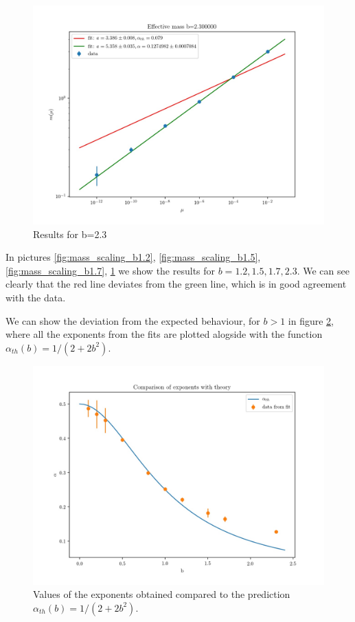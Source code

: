 \documentclass[12pt,a4paper]{report}
\begin{document}
 \begin{figure}
\centering
\includegraphics[width=1.0\textwidth]{b2_3}
\caption{Results for b=2.3}
\label{fig:mass_scaling_b2.3}
\end{figure}

In pictures \ref{fig:mass_scaling_b1.2}, \ref{fig:mass_scaling_b1.5}, \ref{fig:mass_scaling_b1.7}, \ref{fig:mass_scaling_b2.3} we show the results for $b=1.2,1.5,1.7,2.3$. We can see clearly that the red line deviates from the green line, which is in good agreement with the data. 

We can show the deviation from the expected behaviour, for $b>1$ in figure \ref{fig:alphavsb}, where all the exponents from the fits are plotted alogside with the function $\alpha_{th}(b)=1/(2+2b^2)$.


\begin{figure}
\centering
\includegraphics[width=1.0\textwidth]{alphavsb}
\caption{Values of the exponents obtained compared to the prediction $\alpha_{th}(b)=1/(2+2b^2)$.}
\label{fig:alphavsb}
\end{figure} 
\end{document}
